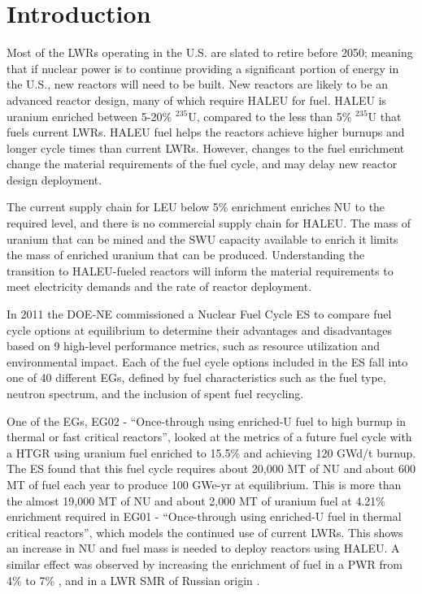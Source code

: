 \section{Introduction}

Most of the \glspl{LWR} operating in the U.S. are slated to retire
before 2050; meaning that if nuclear power is to continue providing a 
significant portion of energy in the U.S., new reactors will need to be built. 
New reactors are likely to be an advanced reactor design, many of 
which require \gls{HALEU} for fuel. \gls{HALEU} is uranium  
enriched between 5-20\% $^{235}$U, compared to the less than 5\% $^{235}$U 
that fuels current \glspl{LWR}. \gls{HALEU} fuel helps 
the reactors achieve higher burnups and longer cycle times than current 
\glspl{LWR}. However, changes to the fuel enrichment change the material 
requirements of the fuel cycle, and may delay 
new reactor design deployment.

The current supply chain for \gls{LEU} below 5\% enrichment 
enriches \gls{NU} to the required level, and there is no commercial 
supply chain for \gls{HALEU}.  
The mass of uranium that can be mined and the \gls{SWU} capacity available 
to enrich it limits the mass of enriched uranium that can be 
produced. Understanding 
the transition to \gls{HALEU}-fueled reactors will inform the material 
requirements to meet electricity demands and 
the rate of reactor deployment.

In 2011 the \gls{DOE-NE} commissioned a Nuclear Fuel Cycle \gls{ES} 
\cite{wigeland_nuclear_2014} to compare fuel cycle options at equilibrium
to determine their advantages and disadvantages
based on 9 high-level performance metrics, such as resource utilization and 
environmental impact. Each of the fuel cycle options included in the 
\gls{ES} fall into one of 40 different \glspl{EG}, defined by fuel 
characteristics such as the fuel type, neutron spectrum, and the inclusion 
of spent fuel recycling. 

One of the \glspl{EG}, \gls{EG}02 - ``Once-through using enriched-U fuel to 
high burnup in thermal or fast critical reactors'', looked at the metrics 
of a future fuel cycle with a \gls{HTGR} using uranium fuel enriched to 
15.5\% and achieving 120 GWd/t burnup. The \gls{ES} found that this fuel cycle
requires about 20,000 MT of \gls{NU} and about 600 MT of fuel each year 
to produce 100 GWe-yr at equilibrium. This is more than the 
almost 19,000 MT of \gls{NU} and about 2,000 MT of uranium fuel at 4.21\%
enrichment required in \gls{EG}01 - ``Once-through using enriched-U 
fuel in thermal critical reactors'', which models the continued use of current 
\glspl{LWR}. This shows an increase in \gls{NU} and fuel mass is needed to 
deploy reactors using \gls{HALEU}.
A similar effect was observed by increasing the enrichment of fuel in a 
\gls{PWR} from 4\% to 7\% \cite{burns_reactor_2020}, and in a \gls{LWR}
\gls{SMR} of Russian origin \cite{hernandez_potential_2020}. 

